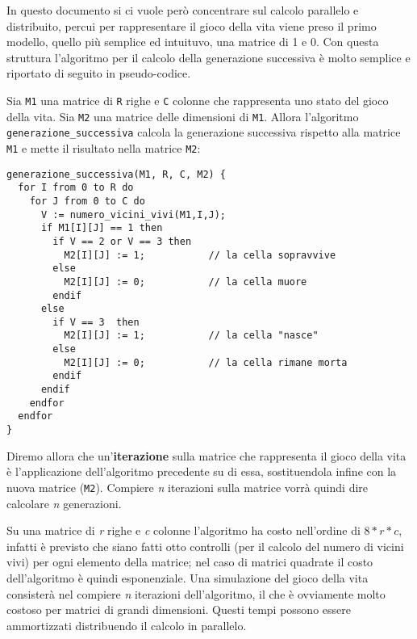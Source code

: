 In questo documento si ci vuole per\`o concentrare sul calcolo parallelo e distribuito, percui per rappresentare il gioco della vita viene preso il primo modello, quello pi\`u semplice ed intuituvo, una matrice di 1 e 0. Con questa struttura l'algoritmo per il calcolo della generazione successiva \`e molto semplice e riportato di seguito in pseudo-codice.

Sia \texttt{M1} una matrice di \texttt{R} righe e \texttt{C} colonne che rappresenta uno stato del gioco della vita. Sia \texttt{M2} una matrice delle dimensioni di \texttt{M1}. Allora l'algoritmo \texttt{generazione\_successiva} calcola la generazione successiva rispetto alla matrice \texttt{M1} e mette il risultato nella matrice \texttt{M2}:
\begin{verbatim}
generazione_successiva(M1, R, C, M2) {
  for I from 0 to R do
    for J from 0 to C do
      V := numero_vicini_vivi(M1,I,J);
      if M1[I][J] == 1 then
        if V == 2 or V == 3 then
          M2[I][J] := 1;           // la cella sopravvive
        else 
          M2[I][J] := 0;           // la cella muore
        endif
      else
        if V == 3  then
          M2[I][J] := 1;           // la cella "nasce"
        else
          M2[I][J] := 0;           // la cella rimane morta
        endif
      endif
    endfor
  endfor
}
\end{verbatim}
\label{alg:nextgeneration}
Diremo allora che un'\textbf{iterazione} sulla matrice che rappresenta il gioco della vita \`e l'applicazione dell'algoritmo precedente su di essa, sostituendola infine con la nuova matrice (\texttt{M2}). Compiere \textit{n} iterazioni sulla matrice vorr\`a quindi dire calcolare \textit{n} generazioni.

Su una matrice di \textit{r} righe e \textit{c} colonne l'algoritmo ha costo nell'ordine di $8*r*c$, infatti \`e previsto che siano fatti otto controlli (per il calcolo del numero di vicini vivi) per ogni elemento della matrice; nel caso di matrici quadrate il costo dell'algoritmo \`e quindi esponenziale. Una simulazione del gioco della vita consister\`a nel compiere \textit{n} iterazioni dell'algoritmo, il che \`e ovviamente molto costoso per matrici di grandi dimensioni. Questi tempi possono essere ammortizzati distribuendo il calcolo in parallelo.
